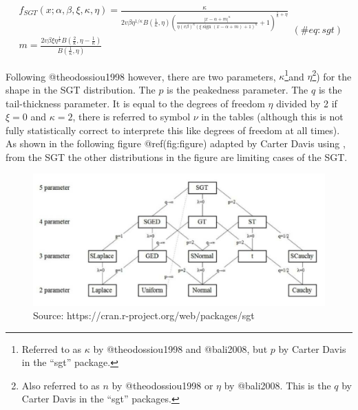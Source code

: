 \documentclass[
]{article}
\begin{document}
\begin{equation}
\begin{array}{c}
f_{S G T}(x ; \alpha, \beta, \xi, \kappa, \eta)=\frac{\kappa}{2 v \beta \eta^{1 / \kappa} B\left(\frac{1}{\kappa}, \eta\right)\left(\frac{|x-\alpha +m|^{\kappa}}{\eta(v \beta)^{\kappa}(\xi \operatorname{sign}(x-\alpha+m)+1)^{\kappa}}+1\right)^{\frac{1}{\kappa}+\eta}} \\
m=\frac{2 v \beta \xi \eta^{\frac{1}{\kappa}} B\left(\frac{2}{\kappa}, \eta-\frac{1}{\kappa}\right)}{B\left(\frac{1}{\kappa}, \eta\right)}
\end{array}
(\#eq:sgt)
\end{equation}

\noindent Following @theodossiou1998 however, there are two parameters,
\(\kappa\)\footnote{Referred to as \(\kappa\) by @theodossiou1998 and
  @bali2008, but \(p\) by Carter Davis in the ``sgt'' package.}and
\(\eta\)\footnote{Also referred to as \(n\) by @theodossiou1998 or
  \(\eta\) by @bali2008. This is the \(q\) by Carter Davis in the
  ``sgt'' packages.}) for the shape in the SGT distribution. The \(p\)
is the peakedness parameter. The \(q\) is the tail-thickness parameter.
It is equal to the degrees of freedom \(\eta\) divided by 2 if
\(\xi = 0\) and \(\kappa = 2\), there is referred to symbol \(\nu\) in
the tables (although this is not fully statistically correct to
interprete this like degrees of freedom at all times). As shown in the
following figure @ref(fig:figure) adapted by Carter Davis using , from
the SGT the other distributions in the figure are limiting cases of the
SGT.

\begin{figure}

{\centering \includegraphics[width=1\linewidth]{SGT} 

}

\caption{Source: https://cran.r-project.org/web/packages/sgt}\label{fig:figure}
\end{figure}
\end{document}
